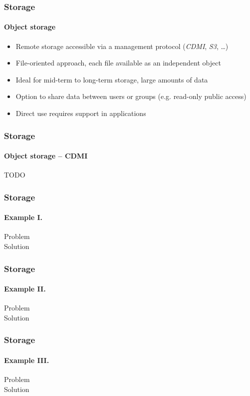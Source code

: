 \begin{frame}
  \frametitle{Storage}
  \framesubtitle{Object storage}

  \begin{itemize}
    \item Remote storage accessible via a management protocol
          (\textit{CDMI}, \textit{S3}, \dots)
    \item File-oriented approach, each file available as
          an independent object
    \item Ideal for mid-term to long-term storage, large
          amounts of data
    \item Option to share data between users or groups
          (e.g. read-only public access)
    \item Direct use requires support in applications
  \end{itemize}
\end{frame}

\begin{frame}
  \frametitle{Storage}
  \framesubtitle{Object storage -- CDMI}

  TODO
\end{frame}

\begin{frame}
  \frametitle{Storage}
  \framesubtitle{Example I.}

  \begin{description}
    \item[Problem]
    \item[Solution]
  \end{description}
\end{frame}

\begin{frame}
  \frametitle{Storage}
  \framesubtitle{Example II.}

  \begin{description}
    \item[Problem]
    \item[Solution]
  \end{description}
\end{frame}

\begin{frame}
  \frametitle{Storage}
  \framesubtitle{Example III.}

  \begin{description}
    \item[Problem]
    \item[Solution]
  \end{description}
\end{frame}

